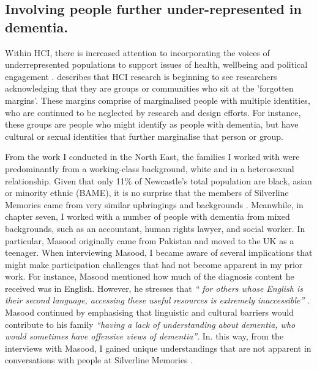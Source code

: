 \subsection{Involving people further under-represented in dementia.}
\label{Under-represented--dementia}
Within HCI, there is increased attention to incorporating the voices of underrepresented populations to support issues of health, wellbeing and political engagement \citep{erete_intersectional_2018}. \cite{harrington_forgotten_2020} describes that HCI research is beginning to see researchers acknowledging that they are groups or communities who sit at the 'forgotten margins'. These margins comprise of marginalised people with multiple identities, who are continued to be neglected by research and design efforts. For instance, these groups are people who might identify as people with dementia, but have cultural or sexual identities that further marginalise that person or group. 

From the work I conducted in the North East, the families I worked with were predominantly from a working-class background, white and in a heterosexual relationship. Given that only 11\% of Newcastle's total population are black, asian or minority ethnic (BAME), it is no surprise that the members of Silverline Memories came from very similar upbringings and backgrounds \citep{cityCouncil_2021}. Meanwhile, in chapter seven, I worked with a number of people with dementia from mixed backgrounds, such as an accountant, human rights lawyer, and social worker. In particular, Masood originally came from Pakistan and moved to the UK as a teenager. When interviewing Masood, I became aware of several implications that might make participation challenges that had not become apparent in my prior work. For instance, Masood mentioned how much of the diagnosis content he received was in English. However, he stresses that \textit{`` for others whose English is their second language, accessing these useful resources is extremely inaccessible''} \citep{cooper2018relationship}. Masood continued by emphasising that linguistic and cultural barriers would contribute to his family \textit{``having a lack of understanding about dementia, who would sometimes have offensive views of dementia''}. In. this way, from the interviews with Masood, I gained unique understandings that are not apparent in conversations with people at Silverline Memories . 

